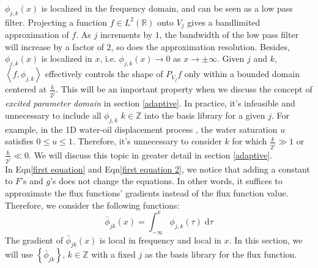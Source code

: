 \documentclass[a4paper,onecolumn]{article}
\theoremstyle{remark}
\begin{document}
\noindent 
$\phi_{j,k}(x)$ is localized in the frequency domain, and can be seen as a low pass filter.
Projecting a function $f \in L^2(\mathbb{R})$
onto $V_j$ gives a bandlimited approximation of $f$.
As $j$ increments by $1$, the bandwidth of the low pass filter will increase by a
factor of $2$,
so does the approximation resolution.
Besides, $\phi_{j,k}(x)$ is localized in $x$, i.e.
$\phi_{j,k}(x)\rightarrow 0$ as $x\rightarrow \pm \infty$.
Given $j$ and $k$,
$\left<f,\phi_{j,k}\right>$ effectively controls 
the shape of $P_{V_j} f$ only within a bounded domain centered at $\frac{k}{2^j}$.
This will be an important property when we discuss the concept of \emph{excited parameter domain}
in section \ref{adaptive}. In practice, it's infeasible and unnecessary to include all $\phi_{j,k}$
$k\in\mathbb{Z}$ into the basis library for a given $j$.
For example, in the 1D water-oil displacement process 
\cite{Buckley Leverett}, the water saturation $u$ satisfies $0\le u\le 1$. Therefore, it's 
unnecessary to consider $k$ for which $\frac{k}{2^j} \gg 1$ or $\frac{k}{2^j} \ll 0$.
We will discuss this topic in greater detail in section \ref{adaptive}.\\

\noindent In Eqn\eqref{first equation} and Eqn\eqref{first equation 2}, we notice that
adding a constant to $F$'s and $g$'s does not change the equations. In other words,
it suffices to approximate the flux functions' gradients instead of the flux function value.
Therefore, we consider the following functions:
\begin{equation}
    \bar{\phi}_{jk}(x) = \int_{-\infty}^x \phi_{j,k}(\tau)\;\textrm{d}\tau
\end{equation}
The gradient of $\bar{\phi}_{jk}(x)$ is local in frequency and
local in $x$. 
In this section, we will use $\left\{\bar{\phi}_{jk}\right\}$, $k\in \mathbb{Z}$ with
a fixed $j$ as the basis library for the flux function. \\
\end{document}
